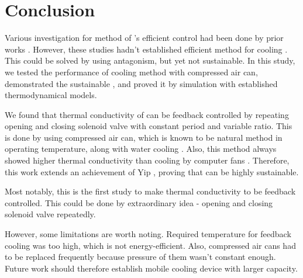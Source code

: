 \section{Conclusion}
Various investigation for method of \scp's efficient control had been done by prior works \cite{haines,mirvakili,yip}. %
However, these studies hadn't established efficient method for cooling \scp. %
This could be solved by using antagonism, but yet not sustainable.
In this study, we tested the performance of cooling method with compressed air can, demonstrated the sustainable \apcnospace, and proved it by simulation with established thermodynamical models. %

We found that thermal conductivity of \scp can be feedback controlled by repeating opening and closing solenoid valve with constant period and variable ratio. %
This is done by using compressed air can, which is known to be natural method in operating temperature, along with water cooling \cite{madden}.
Also, this method always showed higher thermal conductivity than cooling by computer fans \cite{yip}.
Therefore, this work extends an achievement of Yip \etal, proving that \apc can be highly sustainable.

Most notably, this is the first study to make thermal conductivity to be feedback controlled. This could be done by extraordinary idea - opening and closing solenoid valve repeatedly.


However, some limitations are worth noting. Required temperature for feedback cooling was too high, which is not energy-efficient.
Also, compressed air cans had to be replaced frequently because pressure of them wasn't constant enough. 
Future work should therefore establish mobile cooling device with larger capacity.



